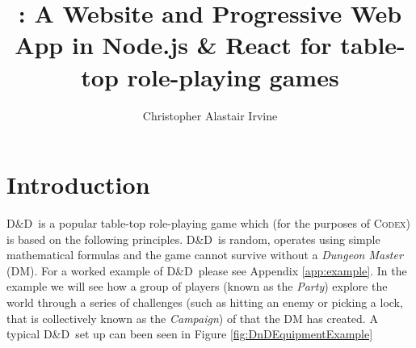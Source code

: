 \documentclass[progress]{cmpreport}
\title{\Codex: A Website and Progressive Web App in Node.js \& React for table-top role-playing games}
\author{Christopher Alastair Irvine}
\newcommand{\dnd}{D\&D}
\newcommand{\Codex}{\textsc{Codex}}
\begin{document}
	\section{Introduction} \label{sec:intro}
	\dnd \ is a popular table-top role-playing game which (for the purposes of \Codex) is based on the following principles. \dnd \ is random, operates using simple mathematical formulas and the game cannot survive without a \emph{Dungeon Master} (DM). For a worked example of \dnd \ please see Appendix \ref{app:example}. In the example we will see how a group of players (known as the \emph{Party}) explore the world through a series of challenges (such as hitting an enemy or picking a lock, that is collectively known as the \emph{Campaign}) of that the DM has created. A typical \dnd \ set up can been seen in Figure \ref{fig:DnDEquipmentExample}
	
\end{document}
